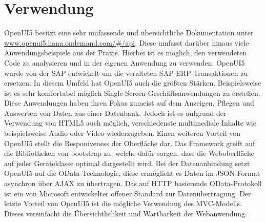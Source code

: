 \section{Verwendung}

OpenUI5 besitzt eine sehr umfassende und übersichtliche Dokumentation unter \url{www.openui5.hana.ondemand.com/#/api}. Diese umfasst darüber hinaus viele Anwendungsbeispiele aus der Praxis. Hierbei ist es möglich, den verwendeten Code zu analysieren und in der eigenen Anwendung zu verwenden. OpenUI5 wurde von der SAP entwickelt um die veralteten SAP ERP-Transaktionen zu ersetzen. In diesem Umfeld hat OpenUI5 auch die größten Stärken. Beispielsweise ist es sehr komfortabel möglich Single-Screen-Geschäftsanwendungen zu erstellen. Diese Anwendungen haben ihren Fokus zumeist auf dem Anzeigen, Pflegen und Auswerten von Daten aus einer Datenbank. Jedoch ist es aufgrund der Verwendung von HTML5 auch möglich, verschiedenste multimediale Inhalte wie beispielsweise Audio oder Video wiederzugeben. Einen weiteren Vorteil von OpenUI5 stellt die Responiveness der Oberfläche dar. Das Framework greift auf die Bibliotheken von bootstrap zu, welche dafür sorgen, dass die Weboberfläche auf jeder Geräteklasse optimal dargestellt wird. Bei der Datenanbindung setzt OpenUI5 auf die OData-Technologie, diese ermöglicht es Daten im JSON-Format asynchron über AJAX zu übertragen. Das auf HTTP basierende OData-Protokoll ist ein von Microsoft entwickelter offener Standard zur Datenübertragung. Der letzte Vorteil von OpenUI5 ist die mögliche Verwendung des MVC-Modells. Dieses vereinfacht die Übersichtlichkeit und Wartbarkeit der Webanwendung. 
